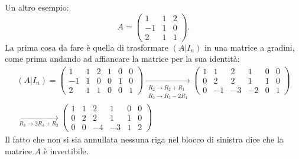 \documentclass{book}
\theoremstyle{definition}
\theoremstyle{plain}
\begin{document}
Un altro esempio:
\begin{equation*}
  A=
  \begin{pmatrix}
    1 & 1 & 2\\
    -1 & 1 & 0\\
    2 & 1 & 1
  \end{pmatrix}.
\end{equation*}
La prima cosa da fare è quella di trasformare $(A|I_n)$ in una matrice a gradini, come
prima andando ad affiancare la matrice per la sua identità:
\begin{eqnarray*}
  (A|I_n)=\left(
  \begin{array}{ccc|ccc}
    1 & 1 & 2 & 1 & 0 & 0\\
    -1 & 1 & 0 & 0 & 1 & 0\\
    2 & 1 & 1 & 0 & 0 & 1
  \end{array}
  \right)\underset{
  \begin{matrix}
    R_2\to R_2 +R_1\\
    R_3\to R_3-2R_1
  \end{matrix}
  }{\to}\left(
  \begin{array}{ccc|ccc}
    1 & 1 & 2 & 1 & 0 & 0\\
    0 & 2 & 2 & 1 & 1 & 0\\
    0 & -1 & -3 & -2 & 0 & 1
  \end{array}
  \right)\\
  \underset{R_3\to 2R_3+R_2}{\to}
  \left(
  \begin{array}{ccc|ccc}
    1 & 1 & 2 & 1& 0&0\\
    0 & 2 & 2 & 1 & 1 & 0\\
    0 & 0 & -4 & -3 & 1 & 2
  \end{array}
  \right)
\end{eqnarray*}
Il fatto che non si sia annullata nessuna riga nel blocco di sinistra dice che la matrice $A$ è
invertibile.
\end{document}
